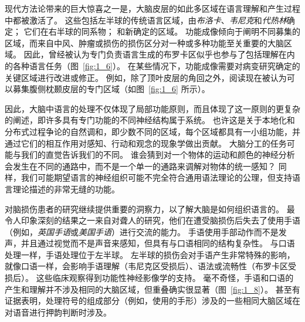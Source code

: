 现代方法论带来的巨大惊喜之一是，大脑皮层的如此多区域在语言理解和产生过程中都被激活了。
这些包括左半球的传统语言区域，由\textit{布洛卡}、\textit{韦尼克}和\textit{代热林}确定； 它们在右半球的同系物；
和新确定的区域。
功能成像倾向于阐明不同募集的区域，而来自中风、肿瘤或损伤的损伤区分对一种或多种功能至关重要的大脑区域。
因此，曾经被认为专门负责语言生成的布罗卡区似乎也参与了包括理解在内的各种语言任务（图~\ref{fig:1_6}）。
在某些情况下，功能成像需要对病变研究确定的关键区域进行改进或修正。
例如，除了顶叶皮层的角回之外，阅读现在被认为可以募集腹侧枕颞皮层的专门区域（如图~\ref{fig:1_6} 所示）。


因此，大脑中语言的处理不仅体现了局部功能原则，而且体现了这一原则的更复杂的阐述，即许多具有专门功能的不同神经结构属于系统。
也许这是关于本地化和分布式过程争论的自然调和，即少数不同的区域，每个区域都具有一小组功能，并通过它们的相互作用对感知、行动和观念的现象学做出贡献。
大脑分工的任务可能与我们的直觉告诉我们的不同。
谁会猜到对一个物体的运动和颜色的神经分析会发生在不同的通路中，而不是一个单一的通路来调解对物体的统一感知？
同样，我们可能期望语言的神经组织可能不完全符合通用语法理论的公理，但支持语言理论描述的非常无缝的功能。


对脑损伤患者的研究继续提供重要的洞察力，以了解大脑是如何组织语言的。
最令人印象深刻的结果之一来自对聋人的研究，他们在遭受脑损伤后失去了使用手语（例如，\textit{英国手语}或\textit{美国手语}）进行交流的能力。
手语使用手部动作而不是发声，并且通过视觉而不是声音来感知，但具有与口语相同的结构复杂性。
与口语处理一样，手语处理位于左半球。 左半球的损伤会对手语产生非常特殊的影响，就像口语一样，会影响手语理解（韦尼克区受损后）、语法或流畅性（布罗卡区受损后）。
这些临床观察得到功能性神经影像学的支持。
毫不奇怪，手语和口语的产生和理解并不涉及相同的大脑区域，但重叠确实很显著（图~\ref{fig:1_8}）。
甚至有证据表明，处理符号的组成部分（例如，使用的手形）涉及的一些相同大脑区域在对语音进行押韵判断时涉及。


